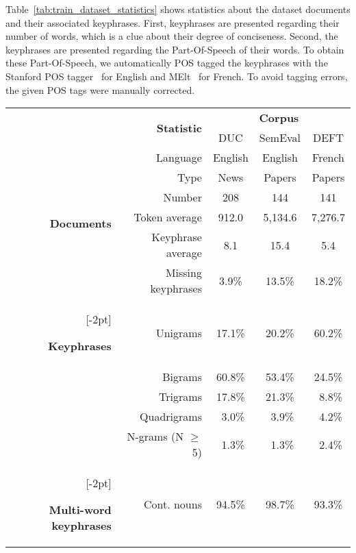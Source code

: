     Table~\ref{tab:train_dataset_statistics} shows statistics about the dataset
    documents and their associated keyphrases. First, keyphrases are presented
    regarding their number of words, which is a clue about their degree of
    conciseness. Second, the keyphrases are presented regarding the
    Part-Of-Speech of their words. To obtain these Part-Of-Speech, we
    automatically POS tagged the keyphrases with the Stanford POS
    tagger~\cite{toutanova2003stanfordpostagger} for English and
    MElt~\cite{denis2009melt} for French. To avoid tagging errors, the given POS
    tags were manually corrected.
    \begin{table}[h]
      \centering
      \begin{tabular}{@{~}r@{~}r@{~}c@{~}c@{~}c@{~}}
        \toprule
        & \multirow{2}{*}[-2pt]{\textbf{Statistic}} & \multicolumn{3}{c}{\textbf{Corpus}}\\
        \cmidrule{3-5}
        & & DUC & SemEval & DEFT\\
        \midrule
        \multirow{6}{*}[-2pt]{\begin{sideways}\textbf{Documents}\end{sideways}} & Language & English & English & French\\
        & Type & News & Papers & Papers\\
        & Number & 208 & 144 & 141\\
        & Token average & 912.0 & 5,134.6 & 7,276.7\\
        & Keyphrase average & 8.1 & 15.4 & 5.4\\
        & Missing keyphrases & 3.9\% & 13.5\% & 18.2\%\\
        \addlinespace[1.5\defaultaddspace]
        \multirow{5}{*}[-2pt]{\begin{sideways}\textbf{Keyphrases}\end{sideways}} & Unigrams & 17.1\% & 20.2\% & 60.2\%\\
        & Bigrams & 60.8\% & 53.4\% & 24.5\%\\
        & Trigrams & 17.8\% & 21.3\% & $~~$8.8\%\\
        & Quadrigrams & $~~$3.0\% & $~~$3.9\% & $~~$4.2\%\\
        & N-grams (N $\geq$ 5) & $~~$1.3\% & $~~$1.3\% & $~~$2.4\%\\
        \addlinespace[1.5\defaultaddspace]
        \multirow{5}{*}[-2pt]{\begin{sideways}\textbf{Multi-word keyphrases}\end{sideways}} & Cont. nouns & 94.5\% & 98.7\% & 93.3\%\\

\end{tabular}
\end{table}
